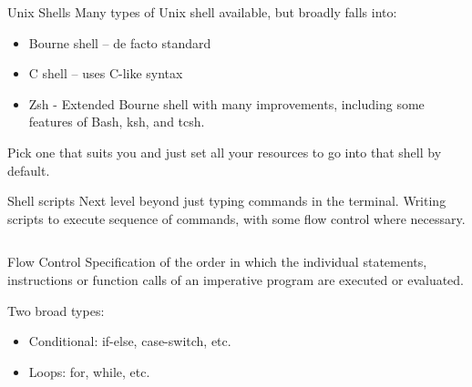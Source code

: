 \documentclass[aspectratio=169]{beamer}
\begin{document}
    \begin{frame}{Unix Shells}
        Many types of Unix shell available, but broadly falls into:
        \begin{itemize}
            \item Bourne shell – de facto standard
            \item C shell – uses C-like syntax
            \item Zsh - Extended Bourne shell with many improvements, including some features of Bash, ksh, and tcsh.
        \end{itemize}

        Pick one that suits you and just set all your resources to go into that shell by default.

    \end{frame}

    \begin{frame}[fragile]{Shell scripts}
        Next level beyond just typing commands in the terminal. Writing scripts to execute sequence of commands, with some flow control where necessary.

        \inputminted{bash}{code/9_unix_for.sh}
    \end{frame}

    \begin{frame}{Flow Control}
        Specification of the order in which the individual statements, instructions or function calls of an imperative program are executed or evaluated.

        Two broad types:
        \begin{itemize}
            \item Conditional: if-else, case-switch, etc.
            \item Loops: for, while, etc.
        \end{itemize}

    \end{frame}
\end{document}
